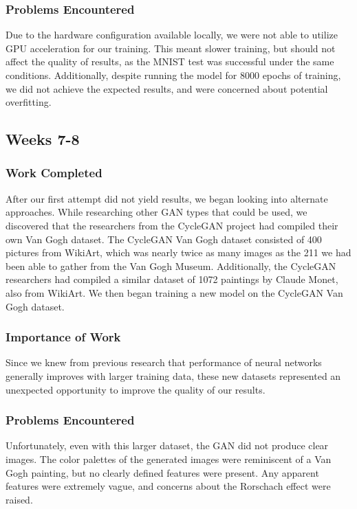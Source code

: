 \documentclass[11pt,letterpaper]{article}
\begin{document}
			\subsubsection{Problems Encountered}
				Due to the hardware configuration available locally, we were not able to utilize GPU acceleration for our training.
				This meant slower training, but should not affect the quality of results, as the MNIST test was successful under the same conditions.
				Additionally, despite running the model for 8000 epochs of training, we did not achieve the expected results, and were concerned about potential overfitting.

		\subsection{Weeks 7-8}
			\subsubsection{Work Completed}
				After our first attempt did not yield results, we began looking into alternate approaches.
				While researching other GAN types that could be used, we discovered that the researchers from the CycleGAN\cite{CycleGAN2017}\cite{isola2017image} project had compiled their own Van Gogh dataset.
				The CycleGAN Van Gogh dataset consisted of 400 pictures from WikiArt\cite{wikiartVanGogh}, which was nearly twice as many images as the 211 we had been able to gather from the Van Gogh Museum.
				Additionally, the CycleGAN researchers had compiled a similar dataset of 1072 paintings by Claude Monet, also from WikiArt.
				We then began training a new model on the CycleGAN Van Gogh dataset.
			\subsubsection{Importance of Work}
				Since we knew from previous research that performance of neural networks generally improves with larger training data, these new datasets represented an unexpected opportunity to improve the quality of our results.
			\subsubsection{Problems Encountered}
				Unfortunately, even with this larger dataset, the GAN did not produce clear images.
				The color palettes of the generated images were reminiscent of a Van Gogh painting, but no clearly defined features were present.
				Any apparent features were extremely vague, and concerns about the Rorschach effect were raised.
\end{document}
